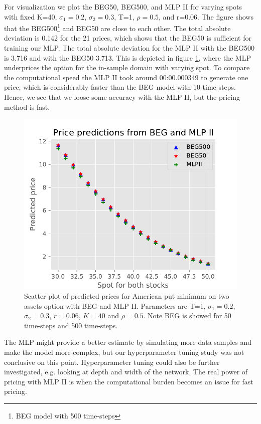 For visualization we plot the BEG50, BEG500, and MLP II for varying spots with fixed K=40, $\sigma_1=0.2$, $\sigma_2=0.3$, T=1, $\rho=0.5$,  and r=0.06. The figure shows that the BEG500\footnote{BEG model with 500 time-steps} and BEG50 are close to each other. The total absolute deviation is 0.142 for the 21 prices, which shows that the BEG50 is sufficient for training our MLP. The total absolute deviation for the MLP II with the BEG500 is 3.716 and with the BEG50 3.713. This is depicted in figure \ref{fig:BEGMLPII}, where the MLP underprices the option for the in-sample domain with varying spot. To compare the computational speed the MLP II took around 00:00.000349 to generate one price, which is considerably faster than the BEG model with 10 time-steps. Hence, we see that we loose some accuracy with the MLP II, but the pricing method is fast. \\

\begin{figure}[H]
\centering
\includegraphics{Figures/compareBEGMLPsII.pdf}
\decoRule
\caption[Compare BEG and MLP II]{Scatter plot of predicted prices for American put minimum on two assets option with BEG and MLP II. Parameters are T=1, $\sigma_1=0.2$, $\sigma_2=0.3$, $r=0.06$, $K=40$ and $\rho=0.5$. Note BEG is showed for 50 time-steps and 500 time-steps.}
\label{fig:BEGMLPII}
\end{figure}

The MLP might provide a better estimate by simulating more data samples and make the model more complex, but our hyperparameter tuning study was not conclusive on this point. Hyperparameter tuning could also be further investigated, e.g. looking at depth and width of the network. The real power of pricing with MLP II is when the computational burden becomes an issue for fast pricing. 

